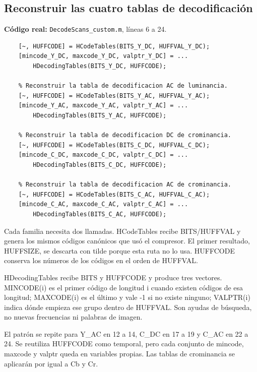 \documentclass[11pt,a4paper,oneside]{report}
\begin{document}
\par\medskip\noindent\begin{minipage}{\linewidth}

\subsection{Reconstruir las cuatro tablas de decodificación}

\textbf{Código real:} \texttt{DecodeScans\_custom.m}, líneas 6 a 24.

\begin{lstlisting}[firstnumber=6]
    % Reconstruir la tabla de decodificacion DC de luminancia.
    [~, HUFFCODE] = HCodeTables(BITS_Y_DC, HUFFVAL_Y_DC);
    [mincode_Y_DC, maxcode_Y_DC, valptr_Y_DC] = ...
        HDecodingTables(BITS_Y_DC, HUFFCODE);

    % Reconstruir la tabla de decodificacion AC de luminancia.
    [~, HUFFCODE] = HCodeTables(BITS_Y_AC, HUFFVAL_Y_AC);
    [mincode_Y_AC, maxcode_Y_AC, valptr_Y_AC] = ...
        HDecodingTables(BITS_Y_AC, HUFFCODE);

    % Reconstruir la tabla de decodificacion DC de crominancia.
    [~, HUFFCODE] = HCodeTables(BITS_C_DC, HUFFVAL_C_DC);
    [mincode_C_DC, maxcode_C_DC, valptr_C_DC] = ...
        HDecodingTables(BITS_C_DC, HUFFCODE);

    % Reconstruir la tabla de decodificacion AC de crominancia.
    [~, HUFFCODE] = HCodeTables(BITS_C_AC, HUFFVAL_C_AC);
    [mincode_C_AC, maxcode_C_AC, valptr_C_AC] = ...
        HDecodingTables(BITS_C_AC, HUFFCODE);
\end{lstlisting}

\end{minipage}\par


Cada familia necesita dos llamadas. HCodeTables recibe BITS/HUFFVAL y genera
los mismos códigos canónicos que usó el compresor. El primer resultado,
HUFFSIZE, se descarta con tilde porque esta ruta no lo usa. HUFFCODE conserva
los números de los códigos en el orden de HUFFVAL.

HDecodingTables recibe BITS y HUFFCODE y produce tres vectores. MINCODE(i)
es el primer código de longitud i cuando existen códigos de esa longitud;
MAXCODE(i) es el último y vale -1 si no existe ninguno; VALPTR(i) indica
dónde empieza ese grupo dentro de HUFFVAL. Son ayudas de búsqueda, no
nuevas frecuencias ni palabras de imagen.

El patrón se repite para Y\_AC en 12 a 14, C\_DC en 17 a 19 y C\_AC en
22 a 24. Se reutiliza HUFFCODE como temporal, pero cada conjunto de mincode,
maxcode y valptr queda en variables propias. Las tablas de crominancia
se aplicarán por igual a Cb y Cr.
\end{document}
